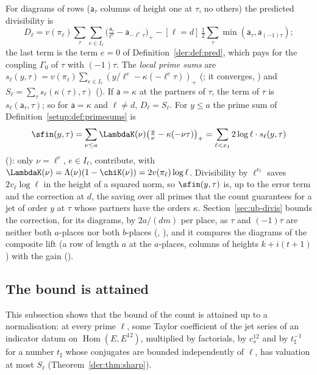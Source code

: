 For diagrams of rows ($\mathsf a_\tau$ columns of height one at $\tau$, no others) the predicted
divisibility is
\[
D_\ell=v(\pi_\ell)\sum_\tau\sum_{e\in I_\ell}\bigl(\tfrac{\mathsf a_\tau}{\ell^e}-\mathsf a_{-\ell^e\tau}\bigr)_+
-[\ell=d]\,\tfrac12\sum_\tau\min(\mathsf a_\tau,\mathsf a_{(-1)\tau});
\]
the last term is the term $e=0$ of Definition~\ref{der:def:pred}, which pays for the coupling
$\Gamma_0$ of $\tau$ with $(-1)\tau$.
The \emph{local prime sums} are
$s_\ell(y,\tau)=v(\pi_\ell)\sum_{e\in I_\ell}(y/\ell^e-\kappa(-\ell^e\tau))_+$
(; it converges, ) and
$S_\ell=\sum_\tau s_\ell(\kappa(\tau),\tau)$ (). If $\mathsf a=\kappa$
at the partners of $\tau$, the term of $\tau$ is $s_\ell(\mathsf a_\tau,\tau)$; so for
$\mathsf a=\kappa$ and $\ell\ne d$, $D_\ell=S_\ell$. For $y\le a$ the prime sum of
Definition~\ref{setup:def:primesums} is
\[
\sfin(y,\tau)=\sum_{\nu\le a}\LambdaK(\nu)\bigl(\tfrac y\nu-\kappa(-\nu\tau)
\bigr)_+=\sum_{\ell<x_1}2\log\ell\cdot s_\ell(y,\tau)
\]
(): only $\nu=\ell^e$, $e\in I_\ell$, contribute, with
$\LambdaK(\nu)=\Lambda(\nu)(1-\chiK(\nu))=2v(\pi_\ell)\log\ell$. Divisibility by $\ell^{v_\ell}$ saves
$2v_\ell\log\ell$ in the height of a squared norm, so $\sfin(y,\tau)$ is, up to the error term and the
correction at $d$, the saving over all primes that the count guarantees for a jet of order $y$ at
$\tau$ whose partners have the orders $\kappa$. Section~\ref{sec:ub-divis} bounds the correction, for
its diagrams, by $2a/(dm)$ per place, as $\tau$ and $(-1)\tau$ are neither both $a$-places nor both
$b$-places (, ),
and it compares the diagrams of the composite lift (a row of length $a$ at the $a$-places, columns
of heights $k+i(t+1)$) with the gain ().

\subsection{The bound is attained}\label{der:sec:sharp}

This subsection shows that the bound of the count is attained up to a normalisation: at every
prime $\ell$, some Taylor coefficient of the jet series of an indicator datum on
$\operatorname{Hom}(E,E^{12})$, multiplied by factorials, by $c_s^{12}$ and by $t_\sharp^{-1}$ for a
number $t_\sharp$ whose conjugates are bounded independently of $\ell$, has valuation at most
$S_\ell$ (Theorem~\ref{der:thm:sharp}).

